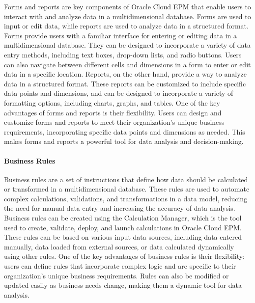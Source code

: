 \documentclass[12pt,a4paper,openright,twoside]{book}
\begin{document}
Forms and reports are key components of Oracle Cloud EPM that enable users to interact with and analyze data in a multidimensional database. 
%
Forms are used to input or edit data, while reports are used to analyze data in a structured format.
%
Forms provide users with a familiar interface for entering or editing data in a multidimensional database. 
%
They can be designed to incorporate a variety of data entry methods, including text boxes, drop-down lists, and radio buttons. 
%
Users can also navigate between different cells and dimensions in a form to enter or edit data in a specific location.
%
Reports, on the other hand, provide a way to analyze data in a structured format. 
%
These reports can be customized to include specific data points and dimensions, and can be designed to incorporate a variety of formatting options, including charts, graphs, and tables.
%
One of the key advantages of forms and reports is their flexibility. 
%
Users can design and customize forms and reports to meet their organization's unique business requirements, incorporating specific data points and dimensions as needed. 
%
This makes forms and reports a powerful tool for data analysis and decision-making.

\paragraph{Business Rules}

Business rules are a set of instructions that define how data should be calculated or transformed in a multidimensional database. 
%
These rules are used to automate complex calculations, validations, and transformations in a data model, reducing the need for manual data entry and increasing the accuracy of data analysis.
%
Business rules can be created using the Calculation Manager, which is the tool used to create, validate, deploy, and launch calculations in Oracle Cloud EPM. 
%
These rules can be based on various input data sources, including data entered manually, data loaded from external sources, or data calculated dynamically using other rules.
%
One of the key advantages of business rules is their flexibility: users can define rules that incorporate complex logic and are specific to their organization's unique business requirements. 
%
Rules can also be modified or updated easily as business needs change, making them a dynamic tool for data analysis.
%
\end{document}
